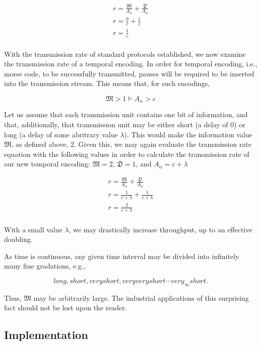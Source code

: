 \documentclass[sigplan]{acmart}
\begin{document}
\begin{eqnarray*}
    r = \frac{\mathfrak{M}}{A_\alpha} + \frac{\mathfrak{D}}{A_\alpha} \\
    r = \frac{0}{c} + \frac{1}{c} \\
    r = \frac{1}{c} \\
\end{eqnarray*}

With the transmission rate of standard protocols established,
we now examine the transmission rate of a temporal encoding.
In order for temporal encoding, i.e., morse code, to be successfully transmitted,
pauses will be required to be inserted into the transmission stream.
This means that, for such encodings,

\[
    \mathfrak{M} > 1 \models A_\alpha > c
\]

Let us assume that each transmission unit contains one bit of information,
and that, additionally, that transmission unit may be either short (a delay
of 0) or long (a delay of some abritrary value $\lambda$). This would
make the information value $\mathfrak{M}$, as defined above, 2.
Given this, we may again evaluate the transmission rate equation
with the following values in order to calculate the transmission
rate of our new temporal encoding:
$\mathfrak{M} = 2$, $\mathfrak{D} = 1$, and $A_\alpha = c + \lambda$

\begin{eqnarray*}
    r = \frac{\mathfrak{M}}{A_\alpha} + \frac{\mathfrak{D}}{A_\alpha} \\
    r = \frac{1}{c + \lambda} + \frac{1}{c + \lambda} \\
    r = \frac{2}{c + \lambda} \\
\end{eqnarray*}

With a small value $\lambda$, we may drastically increase throughput, up to
an effective doubling.

As time is continuous,
any given time interval may be divided into infinitely many fine
gradations, e.g.,
    
\[
    long, short, very short, very very short \cdots very_\infty short.
\]

Thus, $\mathfrak{M}$ may be arbitrarily large. The industrial
applications of this surprising fact should not be lost upon
the reader.

\subsection{Implementation}
\end{document}
